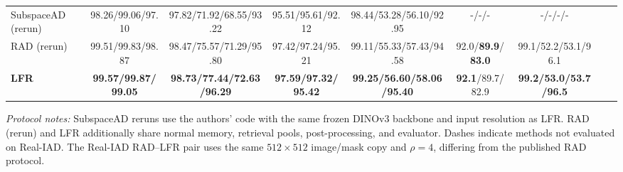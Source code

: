 \begin{table}[t]
\begin{adjustbox}{max width=\textwidth}
\begin{tabular}{lcccccccc}
SubspaceAD (rerun)&98.26/99.06/97.10&97.82/71.92/68.55/93.22&95.51/95.61/92.12&98.44/53.28/56.10/92.95&-/-/-&-/-/-/-\\
RAD (rerun)&99.51/99.83/98.87&98.47/75.57/71.29/95.80&97.42/97.24/95.21&99.11/55.33/57.43/94.58&92.0/\textbf{89.9}/\textbf{83.0}&99.1/52.2/53.1/96.1\\
\textbf{LFR}&\textbf{99.57/99.87/99.05}&\textbf{98.73/77.44/72.63/96.29}&\textbf{97.59/97.32/95.42}&\textbf{99.25/56.60/58.06/95.40}&\textbf{92.1}/89.7/82.9&\textbf{99.2/53.0/53.7/96.5}\\
\bottomrule\end{tabular}
\end{adjustbox}
\par\smallskip
\parbox{\textwidth}{\scriptsize\emph{Protocol notes:} SubspaceAD reruns use the authors' code with the same frozen DINOv3 backbone and input resolution as LFR. RAD (rerun) and LFR additionally share normal memory, retrieval pools, post-processing, and evaluator. Dashes indicate methods not evaluated on Real-IAD. The Real-IAD RAD--LFR pair uses the same $512\times512$ image/mask copy and $\rho=4$, differing from the published RAD protocol.}
\end{table}